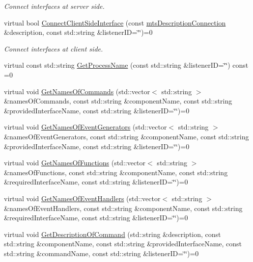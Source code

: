 \begin{DoxyCompactItemize}
\begin{DoxyCompactList}\small\item\em Connect interfaces at server side. \end{DoxyCompactList}\item 
virtual bool \hyperlink{classmts_manager_local_interface_ac89f1ce8ca7e003b085b56aa25a72117}{Connect\+Client\+Side\+Interface} (const \hyperlink{classmts_description_connection}{mts\+Description\+Connection} \&description, const std\+::string \&listener\+I\+D=\char`\"{}\char`\"{})=0
\begin{DoxyCompactList}\small\item\em Connect interfaces at client side. \end{DoxyCompactList}\item 
virtual const std\+::string \hyperlink{classmts_manager_local_interface_af0a457e2895c8e4fc74aebdfce72d7c8}{Get\+Process\+Name} (const std\+::string \&listener\+I\+D=\char`\"{}\char`\"{}) const =0
\item 
virtual void \hyperlink{classmts_manager_local_interface_aab7e0d3a40ec1648db29ac89c4637e8c}{Get\+Names\+Of\+Commands} (std\+::vector$<$ std\+::string $>$ \&names\+Of\+Commands, const std\+::string \&component\+Name, const std\+::string \&provided\+Interface\+Name, const std\+::string \&listener\+I\+D=\char`\"{}\char`\"{})=0
\item 
virtual void \hyperlink{classmts_manager_local_interface_ad38b0648dfc2b65a8e52329c177d60c5}{Get\+Names\+Of\+Event\+Generators} (std\+::vector$<$ std\+::string $>$ \&names\+Of\+Event\+Generators, const std\+::string \&component\+Name, const std\+::string \&provided\+Interface\+Name, const std\+::string \&listener\+I\+D=\char`\"{}\char`\"{})=0
\item 
virtual void \hyperlink{classmts_manager_local_interface_a3173ffcf8034e0349e09a11704a5e488}{Get\+Names\+Of\+Functions} (std\+::vector$<$ std\+::string $>$ \&names\+Of\+Functions, const std\+::string \&component\+Name, const std\+::string \&required\+Interface\+Name, const std\+::string \&listener\+I\+D=\char`\"{}\char`\"{})=0
\item 
virtual void \hyperlink{classmts_manager_local_interface_a6039080ae305d1088608aa8ab3268d3e}{Get\+Names\+Of\+Event\+Handlers} (std\+::vector$<$ std\+::string $>$ \&names\+Of\+Event\+Handlers, const std\+::string \&component\+Name, const std\+::string \&required\+Interface\+Name, const std\+::string \&listener\+I\+D=\char`\"{}\char`\"{})=0
\item 
virtual void \hyperlink{classmts_manager_local_interface_a2d8b5e7595a9e33111ed927b363f22fd}{Get\+Description\+Of\+Command} (std\+::string \&description, const std\+::string \&component\+Name, const std\+::string \&provided\+Interface\+Name, const std\+::string \&command\+Name, const std\+::string \&listener\+I\+D=\char`\"{}\char`\"{})=0

\end{DoxyCompactItemize}
